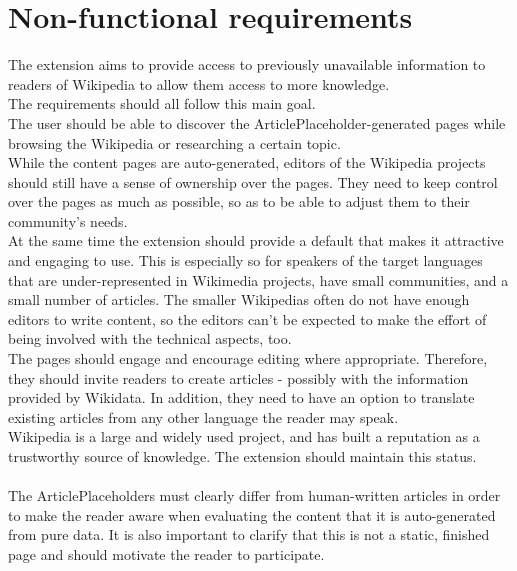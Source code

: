 \chapter{Non-functional requirements}

The extension aims to provide access to previously unavailable information to readers of Wikipedia to allow them access to more knowledge. \\
The requirements should all follow this main goal. \\
The user should be able to discover the ArticlePlaceholder-generated pages while browsing the Wikipedia or researching a certain topic. \\
While the content pages are auto-generated, editors of the Wikipedia projects should still have a sense of ownership over the pages. They need to keep control over the pages as much as possible, so as to be able to adjust them to their community's needs. \\
At the same time the extension should provide a default that makes it attractive and engaging to use. This is especially so for speakers of the target languages that are under-represented in Wikimedia projects, have small communities, and a small number of articles. The smaller Wikipedias often do not have enough editors to write content, so the editors can't be expected to make the effort of being involved with the technical aspects, too.  \\
The pages should engage and encourage editing where appropriate. Therefore, they should invite readers to create articles - possibly with the information provided by Wikidata. In addition, they need to have an option to translate existing articles from any other language the reader may speak. \\
Wikipedia is a large and widely used project, and has built a reputation as a trustworthy source of knowledge. The extension should maintain this status. \\
\\
The ArticlePlaceholders must clearly differ from human-written articles in order to make the reader aware when evaluating the content that it is auto-generated from pure data. It is also important to clarify that this is not a static, finished page and should motivate the reader to participate. \\